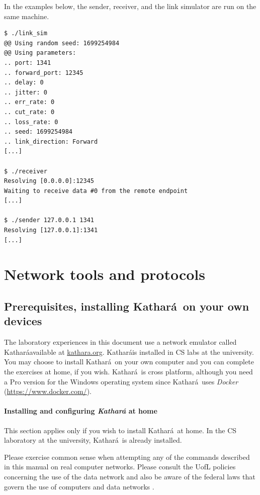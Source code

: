 \documentclass[12pt]{book}
\newcommand{\kathara}{Kathar\'a}
\begin{document}
\begin{enumerate}[label=\arabic*.]
In the examples below, the sender, receiver, and the link simulator are run on the same machine.

\begin{verbatim}
$ ./link_sim 
@@ Using random seed: 1699254984
@@ Using parameters:
.. port: 1341
.. forward_port: 12345
.. delay: 0
.. jitter: 0
.. err_rate: 0
.. cut_rate: 0
.. loss_rate: 0
.. seed: 1699254984
.. link_direction: Forward
[...]

$ ./receiver 
Resolving [0.0.0.0]:12345
Waiting to receive data #0 from the remote endpoint
[...]

$ ./sender 127.0.0.1 1341
Resolving [127.0.0.1]:1341
[...]
\end{verbatim}


\part{Network tools and protocols}\label{kathara.part}

\chapter{Prerequisites, installing \kathara\ on your own devices}\label{intro.se}

The laboratory experiences in this document use a network emulator called \kathara available at \url{kathara.org}. \kathara is installed in CS labs at the university. You may choose to install \kathara\ on your own computer and you can complete the exercises at home, if you wish. \kathara\ is cross platform, although you need a Pro version for the Windows operating system since \kathara\ uses \emph{Docker} (\url{https://www.docker.com/}).

\subsection{Installing and configuring \emph{\kathara} at home}

This section applies only if you wish to install \kathara\ at home. In the CS laboratory at the university, \kathara\ is already installed.

\begin{tcolorbox}[title=Lab safety note]
  Please exercise common sense when attempting any
  of the commands described in this manual on real computer
  networks. Please consult the UofL policies concerning the use of the
  data network \cite{its-policies} and also be aware of the federal
  laws that govern the use of computers and data networks
  \cite{law-canada,law-us}. 
\end{tcolorbox}


\end{enumerate}
\end{document}
